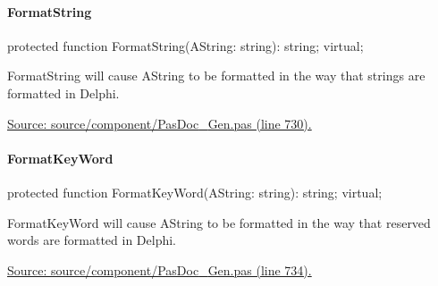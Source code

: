 \documentclass{report}
\newif\ifpdf
\begin{document}
\paragraph*{FormatString}\hspace*{\fill}

\label{PasDoc_Gen.TDocGenerator-FormatString}
\begin{list}{}{
\setlength{\itemindent}{0cm}
\setlength{\listparindent}{0cm}
\setlength{\leftmargin}{\evensidemargin}
\addtolength{\leftmargin}{\tmplength}
\settowidth{\labelsep}{X}
\addtolength{\leftmargin}{\labelsep}
\setlength{\labelwidth}{\tmplength}
}
\item[\textbf{Declaration}\hfill]
\ifpdf
\begin{flushleft}
\fi
\begin{ttfamily}
protected function FormatString(AString: string): string; virtual;\end{ttfamily}

\ifpdf
\end{flushleft}
\fi

\par
\item[\textbf{Description}]
FormatString will cause AString to be formatted in the way that strings are formatted in Delphi.\par
\href{https://github.com/pasdoc/pasdoc/blob/master/source/component/PasDoc_Gen.pas#L730}{Source: source/component/PasDoc{\_}Gen.pas (line 730).}

\end{list}
\paragraph*{FormatKeyWord}\hspace*{\fill}

\label{PasDoc_Gen.TDocGenerator-FormatKeyWord}
\begin{list}{}{
\setlength{\itemindent}{0cm}
\setlength{\listparindent}{0cm}
\setlength{\leftmargin}{\evensidemargin}
\addtolength{\leftmargin}{\tmplength}
\settowidth{\labelsep}{X}
\addtolength{\leftmargin}{\labelsep}
\setlength{\labelwidth}{\tmplength}
}
\item[\textbf{Declaration}\hfill]
\ifpdf
\begin{flushleft}
\fi
\begin{ttfamily}
protected function FormatKeyWord(AString: string): string; virtual;\end{ttfamily}

\ifpdf
\end{flushleft}
\fi

\par
\item[\textbf{Description}]
FormatKeyWord will cause AString to be formatted in the way that reserved words are formatted in Delphi.\par
\href{https://github.com/pasdoc/pasdoc/blob/master/source/component/PasDoc_Gen.pas#L734}{Source: source/component/PasDoc{\_}Gen.pas (line 734).}

\end{list}
\end{document}
